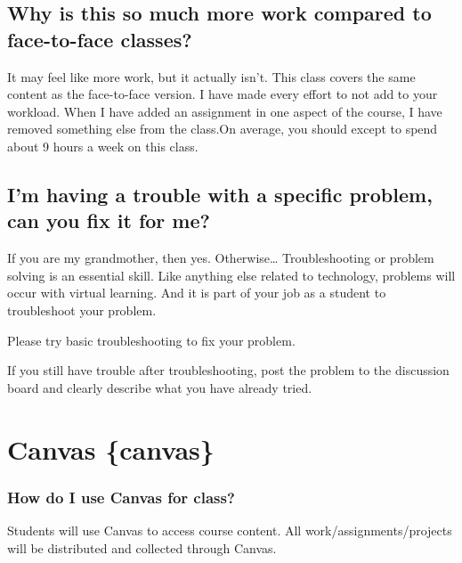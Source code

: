 \documentclass[
]{book}
\begin{document}
\hypertarget{why-is-this-so-much-more-work-compared-to-face-to-face-classes}{%
\subsection{Why is this so much more work compared to face-to-face classes?}\label{why-is-this-so-much-more-work-compared-to-face-to-face-classes}}

It may feel like more work, but it actually isn't. This class covers the same content as the face-to-face version. I have made every effort to not add to your workload. When I have added an assignment in one aspect of the course, I have removed something else from the class.On average, you should except to spend about 9 hours a week on this class.

\hypertarget{im-having-a-trouble-with-a-specific-problem-can-you-fix-it-for-me}{%
\subsection{I'm having a trouble with a specific problem, can you fix it for me?}\label{im-having-a-trouble-with-a-specific-problem-can-you-fix-it-for-me}}

If you are my grandmother, then yes. Otherwise\ldots{} Troubleshooting or problem solving is an essential skill. Like anything else related to technology, problems will occur with virtual learning. And it is part of your job as a student to troubleshoot your problem.

Please try basic troubleshooting to fix your problem.

If you still have trouble after troubleshooting, post the problem to the discussion board and clearly describe what you have already tried.

\hypertarget{canvas-canvas}{%
\section{Canvas \{canvas\}}\label{canvas-canvas}}

\hypertarget{how-do-i-use-canvas-for-class}{%
\subsubsection{How do I use Canvas for class?}\label{how-do-i-use-canvas-for-class}}

Students will use Canvas to access course content.
All work/assignments/projects will be distributed and collected through Canvas.
\end{document}
